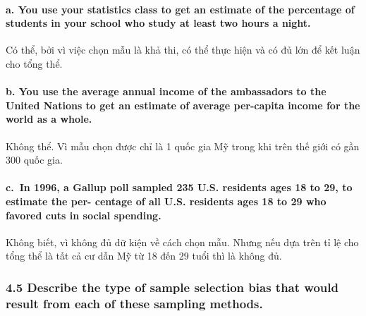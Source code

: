 \documentclass[
]{article}
\begin{document}
\hypertarget{a.-you-use-your-statistics-class-to-get-an-estimate-of-the-percentage-of-students-in-your-school-who-study-at-least-two-hours-a-night.}{%
\paragraph{a. You use your statistics class to get an estimate of the
percentage of students in your school who study at least two hours a
night.}\label{a.-you-use-your-statistics-class-to-get-an-estimate-of-the-percentage-of-students-in-your-school-who-study-at-least-two-hours-a-night.}}

Có thể, bởi vì việc chọn mẫu là khả thi, có thể thực hiện và có đủ lớn
để kết luận cho tổng thể.

\hypertarget{b.-you-use-the-average-annual-income-of-the-ambassadors-to-the-united-nations-to-get-an-estimate-of-average-per-capita-income-for-the-world-as-a-whole.}{%
\paragraph{b. You use the average annual income of the ambassadors to
the United Nations to get an estimate of average per-capita income for
the world as a
whole.}\label{b.-you-use-the-average-annual-income-of-the-ambassadors-to-the-united-nations-to-get-an-estimate-of-average-per-capita-income-for-the-world-as-a-whole.}}

Không thể. Vì mẫu chọn được chỉ là 1 quốc gia Mỹ trong khi trên thế giới
có gần 300 quốc gia.

\hypertarget{c.-in-1996-a-gallup-poll-sampled-235-u.s.-residents-ages-18-to-29-to-estimate-the-per--centage-of-all-u.s.-residents-ages-18-to-29-who-favored-cuts-in-social-spending.}{%
\paragraph{c.~In 1996, a Gallup poll sampled 235 U.S. residents ages 18
to 29, to estimate the per- centage of all U.S. residents ages 18 to 29
who favored cuts in social
spending.}\label{c.-in-1996-a-gallup-poll-sampled-235-u.s.-residents-ages-18-to-29-to-estimate-the-per--centage-of-all-u.s.-residents-ages-18-to-29-who-favored-cuts-in-social-spending.}}

Không biết, vì không đủ dữ kiện về cách chọn mẫu. Nhưng nếu dựa trên tỉ
lệ cho tổng thể là tất cả cư dẫn Mỹ từ 18 đến 29 tuổi thì là không đủ.

\hypertarget{describe-the-type-of-sample-selection-bias-that-would-result-from-each-of-these-sampling-methods.}{%
\subsubsection{4.5 Describe the type of sample selection bias that would
result from each of these sampling
methods.}\label{describe-the-type-of-sample-selection-bias-that-would-result-from-each-of-these-sampling-methods.}}
\end{document}
